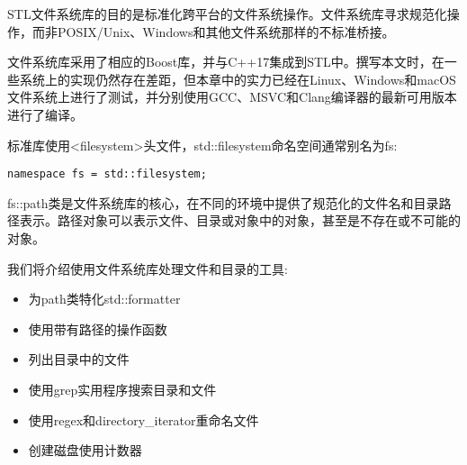 STL文件系统库的目的是标准化跨平台的文件系统操作。文件系统库寻求规范化操作，而非POSIX/Unix、Windows和其他文件系统那样的不标准桥接。

文件系统库采用了相应的Boost库，并与C++17集成到STL中。撰写本文时，在一些系统上的实现仍然存在差距，但本章中的实力已经在Linux、Windows和macOS文件系统上进行了测试，并分别使用GCC、MSVC和Clang编译器的最新可用版本进行了编译。

标准库使用<filesystem>头文件，std::filesystem命名空间通常别名为fs:

\begin{lstlisting}[style=styleCXX]
namespace fs = std::filesystem;
\end{lstlisting}

fs::path类是文件系统库的核心，在不同的环境中提供了规范化的文件名和目录路径表示。路径对象可以表示文件、目录或对象中的对象，甚至是不存在或不可能的对象。

我们将介绍使用文件系统库处理文件和目录的工具:

\begin{itemize}
\item 
为path类特化std::formatter

\item 
使用带有路径的操作函数

\item 
列出目录中的文件

\item 
使用grep实用程序搜索目录和文件

\item 
使用regex和directory\_iterator重命名文件

\item 
创建磁盘使用计数器
\end{itemize}











